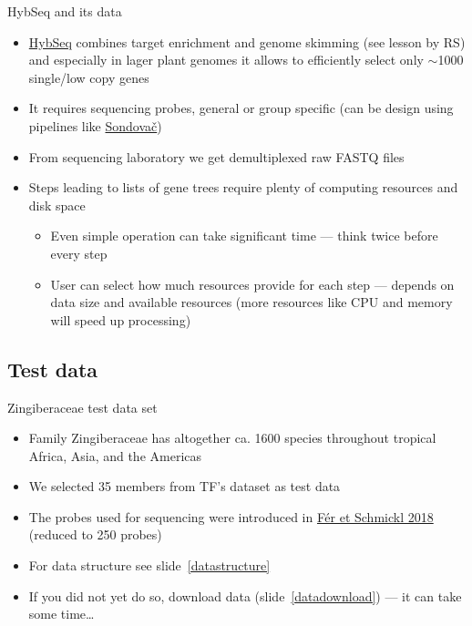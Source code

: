 \documentclass[compress,  xelatex, 11pt, xcolor=x11names, aspectratio=169,
	hyperref={
		bookmarks=true,
		unicode=true,
		colorlinks=true,
		pdftitle={HybSeq course},
		plainpages=false,
		pdfauthor={Vojtech Zeisek},
		pdfsubject={Practical processing of HybSeq target enrichment sequencing data on computing grids like MetaCentrum},
		pdfcreator={XeLaTeX},
		pdfkeywords={BASH, command line, GNU, HybSeq, Linux, MetaCentrum, sequencing shell, target enrichment},
		linkcolor=Turquoise4, %
		anchorcolor=DodgerBlue4, %
		citecolor=DodgerBlue4, %
		filecolor=DodgerBlue4, %
		menucolor=Tan4, %
		urlcolor=DarkOliveGreen4 %
		},
	url={hyphens, lowtilde} %
	]{beamer}
\renewcommand{\texttt}[1]{\colorbox{Cornsilk2}{{\ttfamily #1}}}
\begin{document}
\begin{frame}{HybSeq and its data}
	\begin{itemize}
		\item \href{https://bsapubs.onlinelibrary.wiley.com/doi/full/10.3732/apps.1400042}{HybSeq} combines target enrichment and genome skimming (see lesson by RS) and especially in lager plant genomes it allows to efficiently select only $\sim$1000 single/low copy genes
		\item It requires sequencing probes, general or group specific (can be design using pipelines like \href{https://github.com/V-Z/sondovac/wiki}{Sondovač})
		\item From sequencing laboratory we get demultiplexed raw FASTQ files
		\item Steps leading to lists of gene trees require plenty of computing resources and disk space
		\begin{itemize}
			\item Even simple operation can take significant time --- think twice before every step
			\item User can select how much resources provide for each step --- depends on data size and available resources (more resources like CPU and memory will speed up processing)
		\end{itemize}
	\end{itemize}
\end{frame}

\subsection{Test data}

\begin{frame}{Zingiberaceae test data set}
	\begin{itemize}
		\item Family Zingiberaceae has altogether ca. 1600 species throughout tropical Africa, Asia, and the Americas
		\item We selected 35 members from TF's dataset as test data
		\item The probes used for sequencing were introduced in \href{https://journals.sagepub.com/doi/full/10.1177/1176934317742613}{Fér et Schmickl 2018} (reduced to 250 probes)
		\item For data structure see slide~\ref{datastructure}
		\item If you did not yet do so, download data (slide~\ref{datadownload}) --- it can take some time\ldots
	\end{itemize}
\end{frame}
\end{document}
